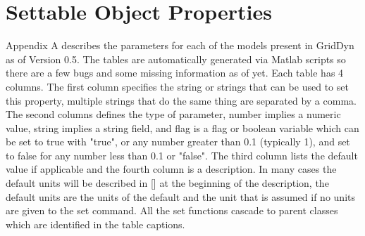\documentclass[12pt]{article} %
\begin{document}



\newpage
\appendix
\setcounter{table}{0}
\renewcommand{\thetable}{A\arabic{table}}
\section{Settable Object Properties} \label{App:AppendixA}

Appendix A describes the parameters for each of the models present in GridDyn as of Version 0.5.  The tables are automatically generated via Matlab scripts so there are a few bugs and some missing information as of yet.  Each table has 4 columns. The first column specifies the string or strings that can be used to set this property,  multiple strings that do the same thing are separated by a comma.  The second columns defines the type of parameter,  number implies a numeric value, string implies a string field, and flag is a flag or boolean variable which can be set to true with "true", or any number greater than 0.1 (typically 1), and set to false for any number less than 0.1 or "false".  The third column lists the default value if applicable and the fourth column is a description.  In many cases the default units will be described in [] at the beginning of the description,  the default units are the units of the default and the unit that is assumed if no units are given to the set command.  All the set functions cascade to parent classes which are identified in the table captions.  

\end{document}
